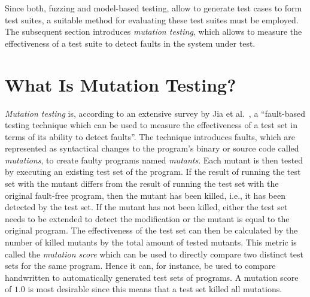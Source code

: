 Since both, fuzzing and model-based testing, allow to generate test cases to form test suites, a suitable method for evaluating these test suites must be employed. The subsequent section introduces \emph{mutation testing}, which allows to measure the effectiveness of a test suite to detect faults in the system under test.

\section{What Is Mutation Testing?}
\label{sec:whatIsMutatinTesting}

\emph{Mutation testing} is, according to an extensive survey by Jia et al.~\cite{jia2011analysis}, a \enquote{fault-based testing technique which can be used to measure the effectiveness of a test set in terms of its ability to detect faults}. The technique introduces faults, which are represented as syntactical changes to the program's binary or source code called \emph{mutations}, to create faulty programs named \emph{mutants}. Each mutant is then tested by executing an existing test set of the program. If the result of running the test set with the mutant differs from the result of running the test set with the original fault-free program, then the mutant has been killed, i.e., it has been detected by the test set. If the mutant has not been killed, either the test set needs to be extended to detect the modification or the mutant is equal to the original program. The effectiveness of the test set can then be calculated by the number of killed mutants by the total amount of tested mutants. This metric is called the \emph{mutation score} which can be used to directly compare two distinct test sets for the same program. Hence it can, for instance, be used to compare handwritten to automatically generated test sets of programs. A mutation score of $1.0$ is most desirable since this means that a test set killed all mutations.

